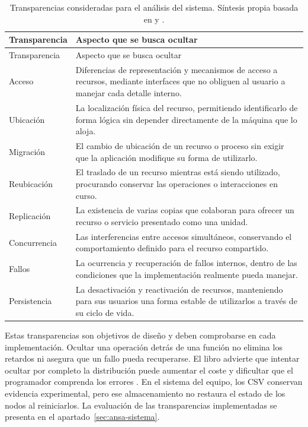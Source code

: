 \begingroup
\small
\renewcommand{\arraystretch}{1.2}
\begin{longtable}{@{}>{\raggedright\arraybackslash}p{3.0cm}>{\raggedright\arraybackslash}p{12.0cm}@{}}
\caption{Transparencias consideradas para el análisis del sistema. Síntesis propia basada en \cite[pp.~11--15]{belinda_vansteen2023_distributed} y \cite[tabla~4]{belinda_soiland2024_transparency}.}
\label{tab:transparencias}\\
\toprule
Transparencia & Aspecto que se busca ocultar \\
\midrule
\endfirsthead
\toprule
Transparencia & Aspecto que se busca ocultar \\
\midrule
\endhead
Acceso & Diferencias de representación y mecanismos de acceso a recursos, mediante interfaces que no obliguen al usuario a manejar cada detalle interno. \\
Ubicación & La localización física del recurso, permitiendo identificarlo de forma lógica sin depender directamente de la máquina que lo aloja. \\
Migración & El cambio de ubicación de un recurso o proceso sin exigir que la aplicación modifique su forma de utilizarlo. \\
Reubicación & El traslado de un recurso mientras está siendo utilizado, procurando conservar las operaciones o interacciones en curso. \\
Replicación & La existencia de varias copias que colaboran para ofrecer un recurso o servicio presentado como una unidad. \\
Concurrencia & Las interferencias entre accesos simultáneos, conservando el comportamiento definido para el recurso compartido. \\
Fallos & La ocurrencia y recuperación de fallos internos, dentro de las condiciones que la implementación realmente pueda manejar. \\
Persistencia & La desactivación y reactivación de recursos, manteniendo para sus usuarios una forma estable de utilizarlos a través de su ciclo de vida. \\
\bottomrule
\end{longtable}
\endgroup

Estas transparencias son objetivos de diseño y deben comprobarse en cada
implementación. Ocultar una operación detrás de una función no elimina los retardos
ni asegura que un fallo pueda recuperarse. El libro advierte que intentar ocultar
por completo la distribución puede aumentar el coste y dificultar que el programador
comprenda los errores \cite[pp.~14--15]{belinda_vansteen2023_distributed}.
En el sistema del equipo, los CSV conservan evidencia experimental, pero ese
almacenamiento no restaura el estado de los nodos al reiniciarlos. La evaluación
de las transparencias implementadas se presenta en el
apartado~\ref{sec:ansa-sistema}.


